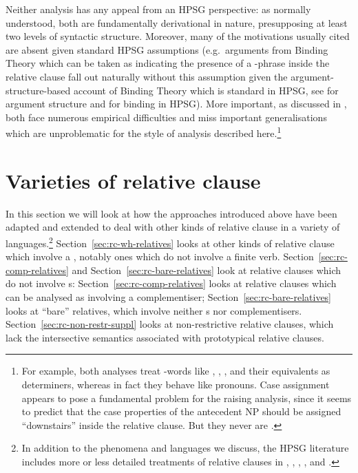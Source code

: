 \documentclass[output=paper
 	        ,biblatex
                ,babelshorthands
                ,newtxmath
                ,draftmode
                ,colorlinks, citecolor=brown
]{langscibook}
\begin{document}
Neither analysis has any appeal from an HPSG perspective: as normally understood, both are
fundamentally derivational in nature, presupposing at least two levels of syntactic
structure. Moreover, many of the motivations usually cited are absent given standard HPSG
assumptions (e.g.\ arguments from Binding Theory which can be taken as indicating the
presence of a -phrase inside the relative clause fall out naturally without this
assumption given the argument-structure-based account of Binding Theory which is standard
in HPSG, see  for argument structure and
   for binding in HPSG). More important, as discussed in
, 
both face numerous empirical difficulties and miss important
generalisations which are unproblematic for the style of analysis described
here.\footnote{For example, both analyses treat -words like
  , , , and their equivalents as determiners, whereas in
  fact they behave like pronouns. Case assignment appears to pose a fundamental problem
  for the raising analysis, since it seems to predict that the case properties of the
  antecedent NP should be assigned ``downstairs'' inside the relative clause. But they
  never are \citep[see][238--239]{Webelhuth18Idioms}.}

\section{Varieties of relative clause}
\label{sec:rc-varieties}
In this section we will look at how the approaches introduced above have been adapted and
extended to deal with other kinds of relative clause in a variety of
languages.\footnote{In addition to the phenomena and languages we discuss, the HPSG
  literature includes more or less detailed treatments of relative clauses in
   \citep{Avgustinova96-Eng,Avgustinova97a-u}, 
  \parencites{Mueller99b}[Chapter~10]{Mueller99a}, 
  \citep{Crysmann:16},  \citep{MMPK2003a-u,Bolc2005a-u}, and 
  \citep{Guengoerdue:96}.  } Section~\ref{sec:rc-wh-relatives} looks at other kinds of
relative clause which involve a , notably ones which do not involve
a finite verb. Section~\ref{sec:rc-comp-relatives} and Section~\ref{sec:rc-bare-relatives}
look at relative clauses which do not involve s:
Section~\ref{sec:rc-comp-relatives} looks at relative clauses which can be analysed as
involving a complementiser; Section~\ref{sec:rc-bare-relatives} looks at ``bare''
relatives, which involve neither s nor
complementisers. Section~\ref{sec:rc-non-restr-suppl} looks at non-restrictive relative
clauses, which lack the intersective semantics associated with prototypical relative
clauses.
\end{document}
